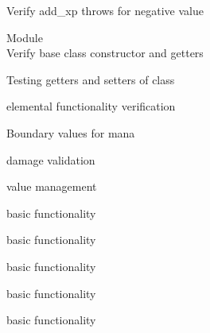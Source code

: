 \begin{DoxyRefList}
\label{test__test000060}%
%
Verify add\+\_\+xp throws for negative value  


\item[Module \doxylink{group__GCI}{GCI} ]\hfill \\
\label{test__test000001}%
%
Verify base  class constructor and getters  



\label{test__test000002}%
%
Testing getters and setters of  class  



\label{test__test000003}%
%
 elemental functionality verification  



\label{test__test000004}%
%
Boundary values for  mana  



\label{test__test000005}%
%
 damage validation  



\label{test__test000007}%
%
 value management  



\label{test__test000009}%
%
 basic functionality  



\label{test__test000011}%
%
 basic functionality  



\label{test__test000013}%
%
 basic functionality  



\label{test__test000015}%
%
 basic functionality  



\label{test__test000017}%
%
 basic functionality  




\end{DoxyRefList}
